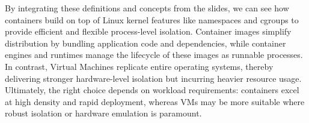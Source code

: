 By integrating these definitions and concepts from the slides, we can see how containers build on top of Linux kernel features like namespaces and cgroups to provide efficient and flexible process-level isolation. Container images simplify distribution by bundling application code and dependencies, while container engines and runtimes manage the lifecycle of these images as runnable processes. In contrast, Virtual Machines replicate entire operating systems, thereby delivering stronger hardware-level isolation but incurring heavier resource usage. Ultimately, the right choice depends on workload requirements: containers excel at high density and rapid deployment, whereas VMs may be more suitable where robust isolation or hardware emulation is paramount.
